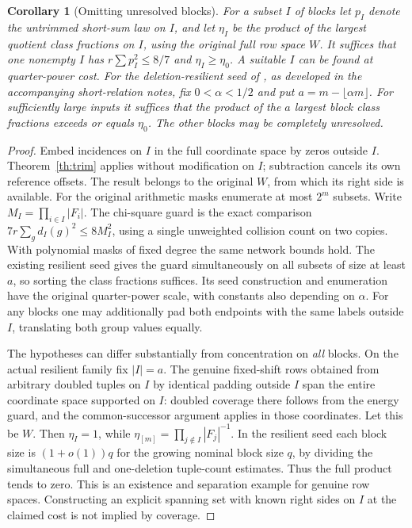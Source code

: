 \documentclass[11pt]{article}
\newtheorem{corollary}[theorem]{Corollary}
\begin{document}
\begin{corollary}[Omitting unresolved blocks]\label{cor:omit}
For a subset $I$ of blocks let $p_I$ denote the untrimmed short-sum law on $I$, and let $\eta_I$ be the product of the largest quotient class fractions on $I$, using the \emph{original full} row space $W$. It suffices that one nonempty $I$ has $r\sum p_I^2\le8/7$ and $\eta_I\ge\eta_0$. A suitable $I$ can be found at quarter-power cost. For the deletion-resilient seed of \cite{repo}, as developed in the accompanying short-relation notes, fix $0<\alpha<1/2$ and put $a=m-\lfloor\alpha m\rfloor$. For sufficiently large inputs it suffices that the product of the $a$ largest block class fractions exceeds or equals $\eta_0$. The other blocks may be completely unresolved.
\end{corollary}
\begin{proof}
Embed incidences on $I$ in the full coordinate space by zeros outside $I$. Theorem~\ref{th:trim} applies without modification on $I$; subtraction cancels its own reference offsets. The result belongs to the original $W$, from which its right side is available. For the original arithmetic masks enumerate at most $2^m$ subsets. Write $M_I=\prod_{i\in I}|F_i|$. The chi-square guard is the exact comparison $7r\sum_g d_I(g)^2\le8M_I^2$, using a single unweighted collision count on two copies. With polynomial masks of fixed degree the same network bounds hold. The existing resilient seed gives the guard simultaneously on all subsets of size at least $a$, so sorting the class fractions suffices. Its seed construction and enumeration have the original quarter-power scale, with constants also depending on $\alpha$. For any blocks one may additionally pad both endpoints with the same labels outside $I$, translating both group values equally.

The hypotheses can differ substantially from concentration on \emph{all} blocks. On the actual resilient family fix $|I|=a$. The genuine fixed-shift rows obtained from arbitrary doubled tuples on $I$ by identical padding outside $I$ span the entire coordinate space supported on $I$: doubled coverage there follows from the energy guard, and the common-successor argument applies in those coordinates. Let this be $W$. Then $\eta_I=1$, while $\eta_{[m]}=\prod_{j\notin I}|F_j|^{-1}$. In the resilient seed each block size is $(1+o(1))q$ for the growing nominal block size $q$, by dividing the simultaneous full and one-deletion tuple-count estimates. Thus the full product tends to zero. This is an existence and separation example for genuine row spaces. Constructing an explicit spanning set with known right sides on $I$ at the claimed cost is not implied by coverage.
\end{proof}
\end{document}

